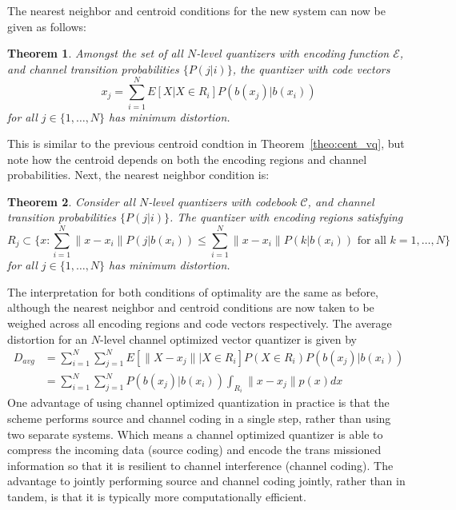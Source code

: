 \documentclass[10pt]{article}
\newtheorem{theorem}{Theorem}[section]
\begin{document}
The nearest neighbor and centroid conditions for the new system can now be given as follows:
\begin{theorem}
\label{theo:cent_covq}
Amongst the set of all $N$-level quantizers with encoding function $\mathcal{E}$, and channel transition probabilities $\{P(j|i)\}$, the quantizer with code vectors
\begin{equation}
  \label{eq:cent_covq}
  x_j = \sum_{i=1}^N E[X | X \in R_i]P(b(x_j)|b(x_i))
\end{equation}
for all $j \in \{1,\ldots,N\}$ has minimum distortion.
\end{theorem}
This is similar to the previous centroid condtion in Theorem~\ref{theo:cent_vq}, but note how the centroid depends on both the encoding regions and channel probabilities. Next, the nearest neighbor condition is:
\begin{theorem}
Consider all $N$-level quantizers with codebook $\mathcal{C}$, and channel transition probabilities $\{P(j|i)\}$. The quantizer with encoding regions satisfying
\begin{equation}
R_j \subset \{x : \sum_{i=1}^N \| x - x_i \|P(j|b(x_i)) \le \sum_{i=1}^N \| x - x_i \|P(k|b(x_i)) \text{ for all } k = 1,\ldots,N \}
\end{equation}
for all $j \in \{1,\ldots,N\}$ has minimum distortion.
\end{theorem}
The interpretation for both conditions of optimality are the same as before, although the nearest neighbor and centroid conditions are now taken to be weighed across all encoding regions and code vectors respectively. The average distortion for an $N$-level channel optimized vector quantizer is given by
\begin{align}
D_{avg} &= \sum_{i=1}^{N} \sum_{j=1}^{N} E[ \|X - x_j\| | X \in R_i] P(X \in R_i) P(b(x_j)|b(x_i))\\
&= \sum_{i=1}^{N} \sum_{j=1}^{N} P(b(x_j)|b(x_i)) \int_{R_i} \|x - x_j\| p(x) dx
\end{align}
One advantage of using channel optimized quantization in practice is that the scheme performs source and channel coding in a single step, rather than using two separate systems. Which means a channel optimized quantizer is able to compress the incoming data (source coding) and encode the trans missioned information so that it is resilient to channel interference (channel coding). The advantage to jointly performing source and channel coding jointly, rather than in tandem, is that it is typically more computationally efficient.
\end{document}
